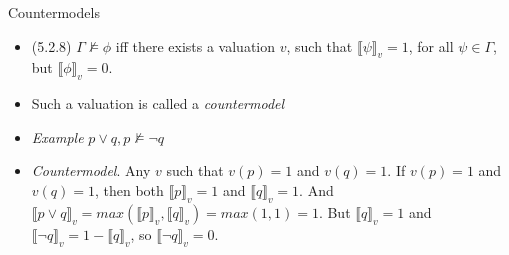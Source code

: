 \documentclass[../slides.tex]{subfiles}
\begin{document}
\begin{frame}{Countermodels}

	\begin{itemize}
	
		\item (5.2.8) $\Gamma\nvDash\phi$ iff there exists a valuation $v$, such that $\llbracket\psi\rrbracket_v=1$, for all $\psi\in\Gamma$, but $\llbracket\phi\rrbracket_v=0$.
		
		\item Such a valuation is called a \emph{countermodel}
		
		\item \emph{Example} $p\lor q, p\nvDash \neg q$
			
		\item[] \emph{Countermodel}. Any $v$ such that $v(p)=1$ and $v(q)=1$. If $v(p)=1$ and $v(q)=1$, then both $\llbracket p\rrbracket_v=1$ and $\llbracket q\rrbracket_v=1$. And $\llbracket p\lor q\rrbracket_v=max(\llbracket p\rrbracket_v,\llbracket q\rrbracket_v)=max(1, 1)=1$. But $\llbracket q\rrbracket_v=1$ and $\llbracket \neg q\rrbracket_v=1-\llbracket q\rrbracket_v$, so $\llbracket \neg q\rrbracket_v=0$.

		
	\end{itemize}

\end{frame}
\end{document}
